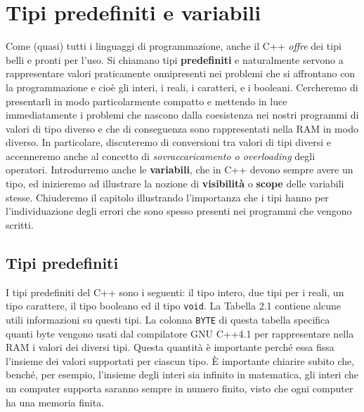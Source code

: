 \documentclass[a4paper,12pt]{book}
\begin{document}
\chapter{Tipi predefiniti e variabili}
\noindent Come (quasi) tutti i linguaggi di programmazione, anche il C++ \textit{offre} dei tipi belli e pronti per l'uso.
Si chiamano tipi \textbf{predefiniti} e naturalmente servono a rappresentare valori praticamente onnipresenti nei problemi che si affrontano con la programmazione e cioè gli interi, i reali, i caratteri, e i booleani.
Cercheremo di presentarli in modo particolarmente compatto e mettendo in luce immediatamente i problemi che nascono dalla coesistenza nei nostri programmi di valori di tipo diverso e che di conseguenza sono rappresentati nella RAM in modo diverso.
In particolare, discuteremo di conversioni tra valori di tipi diversi e accenneremo anche al concetto di \textit{sovraccaricamento o overloading} degli operatori.
Introdurremo anche le \textbf{variabili}, che in C++ devono sempre avere un tipo, ed inizieremo ad illustrare la nozione di \textbf{visibilità} o \textbf{scope} delle variabili stesse.
Chiuderemo il capitolo illustrando l'importanza che i tipi hanno per l'individuazione degli errori che sono spesso presenti nei programmi che vengono scritti. 

\section{Tipi predefiniti}
\noindent I tipi predefiniti del C++ sono i seguenti: il tipo intero, due tipi per i reali, un tipo carattere, il tipo booleano ed il tipo \texttt{void}.
La Tabella 2.1 contiene alcune utili informazioni su questi tipi.
La colonna \texttt{BYTE} di questa tabella specifica quanti byte vengono usati dal compilatore GNU C++4.1 per rappresentare nella RAM i valori dei diversi tipi.
Questa quantità è importante perché essa fissa l'insieme dei valori supportati per ciascun tipo.
È importante chiarire subito che, benché, per esempio, l'insieme degli interi sia infinito in matematica, gli interi che un computer supporta saranno sempre in numero finito, visto che ogni computer ha una memoria finita.
\end{document}

